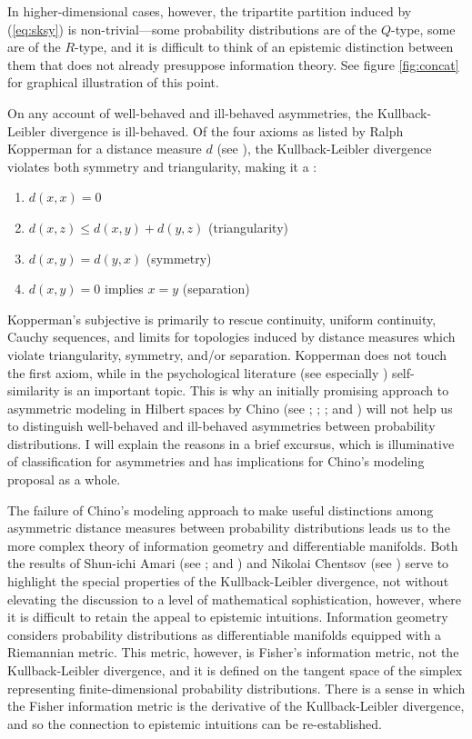 \documentclass[11pt]{article}
\begin{document}
In higher-dimensional cases, however, the tripartite partition induced
by (\ref{eq:sksy}) is non-trivial---some probability distributions are
of the $Q$-type, some are of the $R$-type, and it is difficult to
think of an epistemic distinction between them that does not already
presuppose information theory. See figure \ref{fig:concat} for
graphical illustration of this point.

On any account of well-behaved and ill-behaved asymmetries, the
Kullback-Leibler divergence is ill-behaved. Of the four axioms as
listed by Ralph Kopperman for a distance measure $d$ (see
), the Kullback-Leibler divergence violates
both symmetry and triangularity, making it a :

\begin{enumerate}[(m1)]
\item $d(x,x)=0$
\item $d(x,z)\leq{}d(x,y)+d(y,z)$ (triangularity)
\item $d(x,y)=d(y,x)$ (symmetry)
\item $d(x,y)=0$ implies $x=y$ (separation)
\end{enumerate}

Kopperman's subjective is primarily to rescue continuity, uniform
continuity, Cauchy sequences, and limits for topologies induced by
distance measures which violate triangularity, symmetry, and/or
separation. Kopperman does not touch the first axiom, while in the
psychological literature (see especially )
self-similarity is an important topic. This is why an initially
promising approach to asymmetric modeling in Hilbert spaces by 
Chino (see ; ;
; and ) will not
help us to distinguish well-behaved and ill-behaved asymmetries
between probability distributions. I will explain the reasons in a
brief excursus, which is illuminative of classification for
asymmetries and has implications for Chino's modeling proposal as a
whole. 

The failure of Chino's modeling approach to make useful distinctions
among asymmetric distance measures between probability distributions
leads us to the more complex theory of information geometry and
differentiable manifolds. Both the results of Shun-ichi Amari (see
; and ) and Nikolai
Chentsov (see ) serve to highlight the special
properties of the Kullback-Leibler divergence, not without elevating
the discussion to a level of mathematical sophistication, however,
where it is difficult to retain the appeal to epistemic intuitions.
Information geometry considers probability distributions as
differentiable manifolds equipped with a Riemannian metric. This
metric, however, is Fisher's information metric, not the
Kullback-Leibler divergence, and it is defined on the tangent space of
the simplex representing finite-dimensional probability distributions.
There is a sense in which the Fisher information metric is the
derivative of the Kullback-Leibler divergence, and so the connection
to epistemic intuitions can be re-established.
\end{document}
